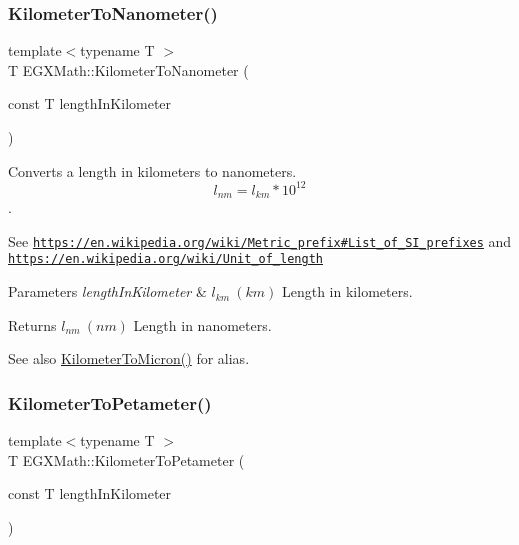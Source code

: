 \subsubsection{\texorpdfstring{Kilometer\+To\+Nanometer()}{KilometerToNanometer()}}
{\footnotesize\ttfamily template$<$typename T $>$ \\
T E\+G\+X\+Math\+::\+Kilometer\+To\+Nanometer (\begin{DoxyParamCaption}\item[{const T}]{length\+In\+Kilometer }\end{DoxyParamCaption})}



Converts a length in kilometers to nanometers. \[ l_{nm}=l_{km} * 10^{12} \]. 

See \href{https://en.wikipedia.org/wiki/Metric_prefix#List_of_SI_prefixes}{\tt https\+://en.\+wikipedia.\+org/wiki/\+Metric\+\_\+prefix\#\+List\+\_\+of\+\_\+\+S\+I\+\_\+prefixes} and \href{https://en.wikipedia.org/wiki/Unit_of_length}{\tt https\+://en.\+wikipedia.\+org/wiki/\+Unit\+\_\+of\+\_\+length} 
\begin{DoxyParams}{Parameters}
{\em length\+In\+Kilometer} & $ l_{km}\ (km)$ Length in kilometers. \\
\hline
\end{DoxyParams}
\begin{DoxyReturn}{Returns}
$ l_{nm}\ (nm)$ Length in nanometers. 
\end{DoxyReturn}
\begin{DoxySeeAlso}{See also}
\mbox{\hyperlink{group___e_g_x_math-_conversions-_length_conversions-_s_i-_kilometer-_non-_s_i_gae662bafe0d1fc36276a336fd969307a0}{Kilometer\+To\+Micron()}} for alias. 
\end{DoxySeeAlso}
\mbox{\label{group___e_g_x_math-_conversions-_length_conversions-_s_i-_kilometer-_s_i_ga79a0e22448e08eeb755577316635058a}} 
\subsubsection{\texorpdfstring{Kilometer\+To\+Petameter()}{KilometerToPetameter()}}
{\footnotesize\ttfamily template$<$typename T $>$ \\
T E\+G\+X\+Math\+::\+Kilometer\+To\+Petameter (\begin{DoxyParamCaption}\item[{const T}]{length\+In\+Kilometer }\end{DoxyParamCaption})}



